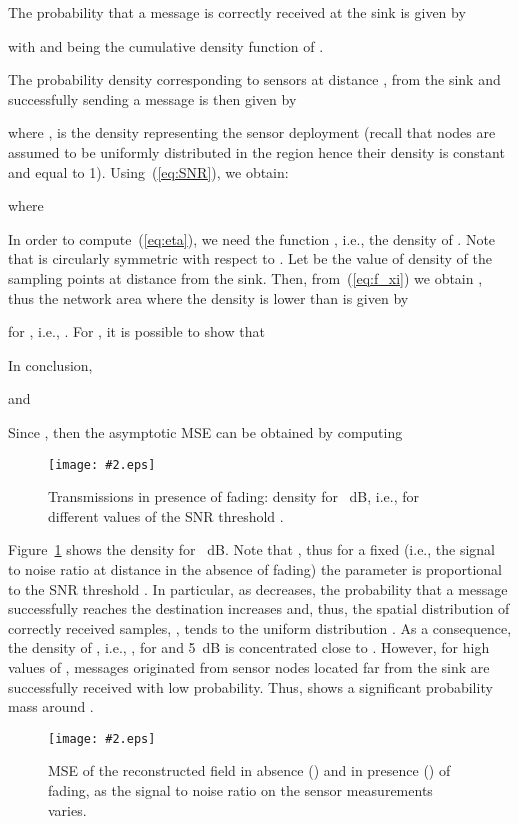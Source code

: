 \documentclass[11pt, draftcls, onecolumn, a4paper]{IEEEtran}
\newcommand{\insertfig}[4]{
\begin{figure}[ht]
\centerline{\texttt{[image: \#2.eps]}}
\caption{#3}\label{#4}\end{figure}}
\begin{document}
The probability that a message is correctly received at the sink is
given by

with  and  being the cumulative density
function of .

The probability density  corresponding to
sensors at distance ,  from the sink and successfully sending a message 
is then given by

where , 
is the density representing the sensor deployment (recall that  
nodes are assumed to be uniformly distributed in the region
hence their density is constant and equal to 1).
Using~(\ref{eq:SNR}), we obtain:

where


In order to compute~(\ref{eq:eta}), we need the function ,
i.e., the density of . Note that 
is circularly symmetric with respect to .  Let  be
the value of density of the sampling points at distance 
 from
the sink.  Then, from~(\ref{eq:f_xi}) we obtain
, thus the network area where
the density is lower than  is given by

for , i.e.,  .
For , it is possible to show that
 
In conclusion,

and

Since , then the asymptotic MSE can be obtained by computing


\insertfig{0.8}{g}{Transmissions in presence of fading: density 
 for ~dB, i.e., for different values of the 
SNR threshold .}{fig:g}

Figure~\ref{fig:g} shows the density  for ~dB. 
Note that , thus for a fixed  (i.e.,
the signal to noise ratio at distance  in the absence of fading)
the parameter  is proportional to the SNR threshold . In particular,
as  decreases, the probability that a message successfully
reaches the destination increases and, thus, the spatial
distribution of correctly received samples, , tends to
the uniform distribution . As a consequence, the density of
, i.e., , for  and 5~dB 
is concentrated close to . 
However, for high values of , messages originated from
sensor nodes located far from the sink are successfully received
with low probability. Thus,  shows a significant 
probability mass around .

\insertfig{0.8}{mse}{MSE of the reconstructed field in absence
() and in presence () of fading, as the signal to noise 
ratio on the sensor measurements varies.}{fig:mse}
\end{document}
